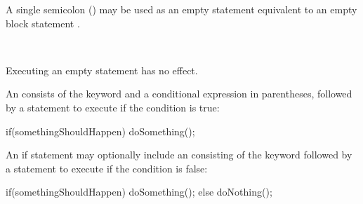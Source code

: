 
A single semicolon (\Char{;}) may be used as an empty statement equivalent to an empty block statement \Char{\{}\Char{\}}.

\begin{Syntax}
	 \\
		\code{;}
\end{Syntax}

Executing an empty statement has no effect.

\begin{Checking}

	\CheckStmt{\ContextVarA}{ \code{;} }{\ContextVarA}

\end{Checking}



An  consists of the  keyword and a conditional expression in parentheses, followed by a statement to execute if the condition is true:

\begin{codeblock}
if(somethingShouldHappen)
    doSomething();
\end{codeblock}

An if statement may optionally include an  consisting of the keyword  followed by a statement to execute if the condition is false:

\begin{codeblock}
if(somethingShouldHappen)
 	doSomething();
else
	doNothing();
\end{codeblock}

\begin{Syntax}
	 \\
		 \code{(}  \code{)} \\
		 \\
		\SynOpt

	 \\
		\SynOr {}
		
	 \\

	 \\
		 
\end{Syntax}

